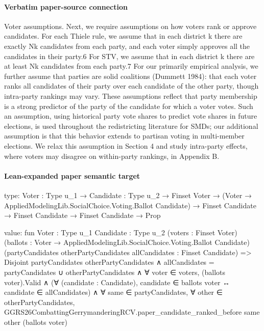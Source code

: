 \documentclass[10pt]{article}
\begin{document}
\paragraph{Verbatim paper-source connection}
\begin{ReviewVerbatim}
Voter assumptions. Next, we require assumptions on how voters rank or approve candidates.
For each Thiele rule, we assume that in each district k there are exactly Nk candidates from each
party, and each voter simply approves all the candidates in their party.6 For STV, we assume that
in each district k there are at least Nk candidates from each party.7 For our primarily empirical
analysis, we further assume that parties are solid coalitions (Dummett 1984): that each voter ranks
all candidates of their party over each candidate of the other party, though intra-party rankings
may vary. These assumptions reflect that party membership is a strong predictor of the party of
the candidate for which a voter votes. Such an assumption, using historical party vote shares to
predict vote shares in future elections, is used throughout the redistricting literature for SMDs; our
additional assumption is that this behavior extends to partisan voting in multi-member elections.
We relax this assumption in Section 4 and study intra-party effects, where voters may disagree on
within-party rankings, in Appendix B.
\end{ReviewVerbatim}



\paragraph{Lean-expanded paper semantic target}
\begin{ReviewVerbatim}
type:
{Voter : Type u_1} →
  {Candidate : Type u_2} →
    Finset Voter →
      (Voter → AppliedModelingLib.SocialChoice.Voting.Ballot Candidate) →
        Finset Candidate → Finset Candidate → Finset Candidate → Prop

value:
fun {Voter : Type u_1} {Candidate : Type u_2} (voters : Finset Voter)
    (ballots : Voter → AppliedModelingLib.SocialChoice.Voting.Ballot Candidate)
    (partyCandidates otherPartyCandidates allCandidates : Finset Candidate) =>
  Disjoint partyCandidates otherPartyCandidates ∧
    allCandidates = partyCandidates ∪ otherPartyCandidates ∧
      ∀ voter ∈ voters,
        (ballots voter).Valid ∧
          (∀ (candidate : Candidate), candidate ∈ ballots voter ↔ candidate ∈ allCandidates) ∧
            ∀ same ∈ partyCandidates,
              ∀ other ∈ otherPartyCandidates,
                GGRS26CombattingGerrymanderingRCV.paper_candidate_ranked_before same other (ballots voter)
\end{ReviewVerbatim}
\end{document}
